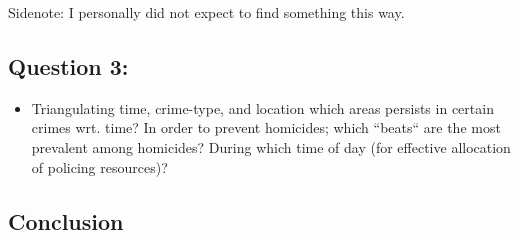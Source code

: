 \documentclass[a4paper]{article}
\begin{document}
Sidenote: I personally did not expect to find something this way. 



\subsection{Question 3:}




\begin{itemize}
  \item Triangulating time, crime-type, and location which areas persists in certain crimes wrt. time?
In order to prevent homicides; which “beats“ are the most prevalent among homicides? During which time of day (for effective allocation of policing resources)? 
\end{itemize}







\subsection{Conclusion}
\end{document}
